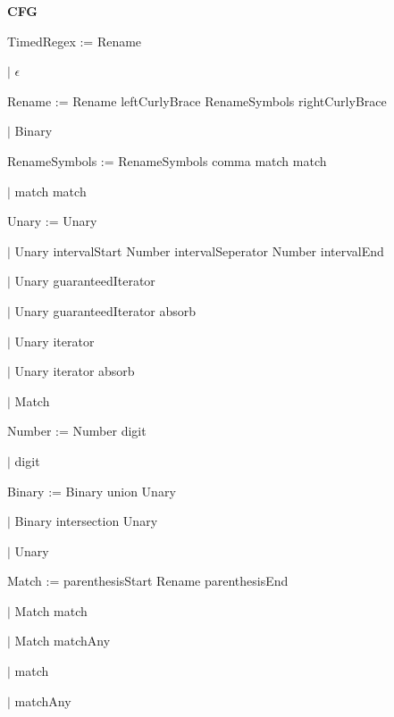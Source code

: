 
\textbf{CFG}

TimedRegex := Rename

\qquad	$\mid$ $\epsilon$

Rename := Rename leftCurlyBrace RenameSymbols rightCurlyBrace

\qquad $\mid$ Binary

RenameSymbols := RenameSymbols comma match match

\qquad $\mid$ match match

Unary := Unary

\qquad $\mid$ Unary intervalStart Number intervalSeperator Number intervalEnd

\qquad $\mid$ Unary guaranteedIterator

\qquad $\mid$ Unary guaranteedIterator absorb

\qquad $\mid$ Unary iterator

\qquad $\mid$ Unary iterator absorb

\qquad $\mid$ Match

Number := Number digit

\qquad $\mid$ digit

Binary := Binary union Unary

\qquad $\mid$ Binary intersection Unary

\qquad $\mid$ Unary

Match := parenthesisStart Rename parenthesisEnd

\qquad $\mid$ Match match

\qquad $\mid$ Match matchAny

\qquad $\mid$ match

\qquad $\mid$ matchAny

